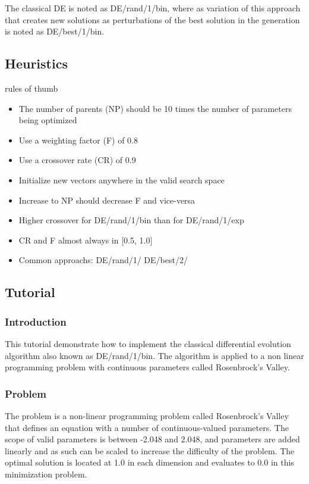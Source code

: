 The classical DE is noted as DE/rand/1/bin, where as variation of this approach that creates new solutions as perturbations of the best solution in the generation is noted as DE/best/1/bin.

\subsection{Heuristics}
rules of thumb

\begin{itemize}
	\item The number of parents (NP) should be 10 times the number of parameters being optimized
	\item Use a weighting factor (F) of 0.8
	\item Use a crossover rate (CR) of 0.9
	\item Initialize new vectors anywhere in the valid search space
	\item Increase to NP should decrease F and vice-versa
	\item Higher crossover for DE/rand/1/bin than for DE/rand/1/exp
	\item CR and F almost always in [0.5, 1.0]
	\item Common approachs: DE/rand/1/ DE/best/2/
\end{itemize}

\subsection{Tutorial}

\subsubsection{Introduction}
This tutorial demonstrate how to implement the classical differential evolution algorithm also known as DE/rand/1/bin. The algorithm is applied to a non linear programming problem with continuous parameters called Rosenbrock's Valley.

\subsubsection{Problem}
The problem is a non-linear programming problem called Rosenbrock's Valley that defines an equation with a number of continuous-valued parameters. The scope of valid parameters is between -2.048 and 2.048, and parameters are added linearly and as such can be scaled to increase the difficulty of the problem. The optimal solution is located at 1.0 in each dimension and evaluates to 0.0 in this minimization problem.


